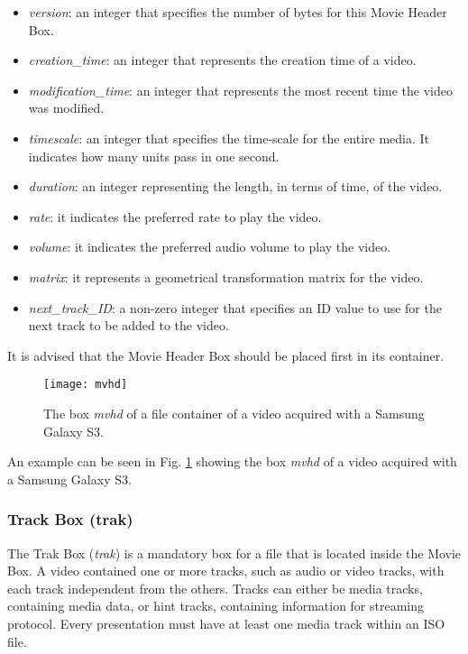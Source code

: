 \begin{itemize}
\item \emph{version}: an integer that specifies the number of bytes for this Movie Header Box.
\item \emph{creation\_time}: an integer that represents the creation time of a video.
\item \emph{modification\_time}: an integer that represents the most recent time the video was modified.
\item \emph{timescale}: an integer that specifies the time-scale for the entire media. It indicates how many units pass in one second.
\item \emph{duration}: an integer representing the length, in terms of time, of the video.
\item \emph{rate}: it indicates the preferred rate to play the video.
\item \emph{volume}: it indicates the preferred audio volume to play the video.
\item \emph{matrix}: it represents a geometrical transformation matrix for the video.
\item \emph{next\_track\_ID}: a non-zero integer that specifies an ID value to use for the next track to be added to the video.
\end{itemize}

It is advised that the Movie Header Box should be placed first in its container.

\begin{figure}
  \centering
  \texttt{[image: mvhd]}
  \caption{The box \emph{mvhd} of a file container of a video acquired with a Samsung Galaxy S3.}\label{fig:mvhd}
\end{figure}

An example can be seen in Fig. \ref{fig:mvhd} showing the box \emph{mvhd} of a video acquired with a Samsung Galaxy S3.

\subsubsection*{Track Box (trak)}

The Trak Box (\emph{trak}) is a mandatory box for a file that is located inside the Movie Box. A video contained one or more tracks, such as audio or video tracks, with each track independent from the others. Tracks can either be media tracks, containing media data, or hint tracks, containing information for streaming protocol. Every presentation must have at least one media track within an ISO file.

